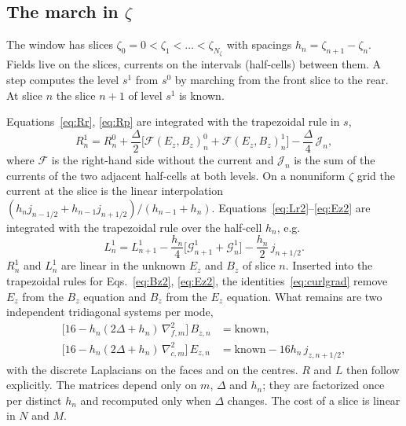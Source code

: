 \documentclass[preprint,12pt]{elsarticle}
\begin{document}
\subsection{The march in $\zeta$}\label{sec:march}

The window has slices $\zeta_0 = 0 < \zeta_1 < \dots < \zeta_{N_\zeta}$ with spacings $h_n = \zeta_{n+1} - \zeta_n$. Fields live on the slices, currents on the intervals (half-cells) between them. A step computes the level $s^1$ from $s^0$ by marching from the front slice to the rear. At slice $n$ the slice $n+1$ of level $s^1$ is known.

Equations~\eqref{eq:Rr}, \eqref{eq:Rp} are integrated with the trapezoidal rule in $s$,
\begin{equation}
R^1_n = R^0_n + \frac{\Delta}{2}\bigl[\mathcal F(E_z, B_z)^0_n + \mathcal F(E_z, B_z)^1_n\bigr] - \frac{\Delta}{4}\,\mathcal J_n, \label{eq:Rdisc}
\end{equation}
where $\mathcal F$ is the right-hand side without the current and $\mathcal J_n$ is the sum of the currents of the two adjacent half-cells at both levels. On a nonuniform $\zeta$ grid the current at the slice is the linear interpolation $(h_n j_{n-1/2} + h_{n-1} j_{n+1/2})/(h_{n-1} + h_n)$. Equations~\eqref{eq:Lr2}--\eqref{eq:Ez2} are integrated with the trapezoidal rule over the half-cell $h_n$, e.g.
\begin{equation}
L^1_n = L^1_{n+1} - \frac{h_n}{4}\bigl[\mathcal G^1_{n+1} + \mathcal G^1_n\bigr] - \frac{h_n}{2}\, j_{n+1/2}. \label{eq:Ldisc}
\end{equation}
$R^1_n$ and $L^1_n$ are linear in the unknown $E_z$ and $B_z$ of slice $n$. Inserted into the trapezoidal rules for Eqs.~\eqref{eq:Bz2}, \eqref{eq:Ez2}, the identities~\eqref{eq:curlgrad} remove $E_z$ from the $B_z$ equation and $B_z$ from the $E_z$ equation. What remains are two independent tridiagonal systems per mode,
\begin{align}
\bigl[16 - h_n(2\Delta + h_n)\,\nabla^2_{f,m}\bigr]\, B_{z,n} &= \text{known}, \\
\bigl[16 - h_n(2\Delta + h_n)\,\nabla^2_{c,m}\bigr]\, E_{z,n} &= \text{known} - 16 h_n\, j_{z,n+1/2},
\end{align}
with the discrete Laplacians on the faces and on the centres. $R$ and $L$ then follow explicitly. The matrices depend only on $m$, $\Delta$ and $h_n$; they are factorized once per distinct $h_n$ and recomputed only when $\Delta$ changes. The cost of a slice is linear in $N$ and $M$.
\end{document}
